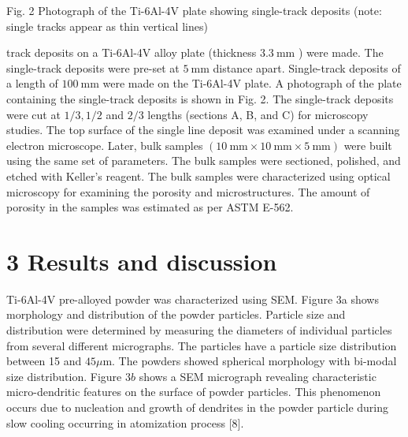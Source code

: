 \documentclass[10pt]{article}
\begin{document}
Fig. 2 Photograph of the Ti-6Al-4V plate showing single-track deposits (note: single tracks appear as thin vertical lines)

track deposits on a Ti-6Al-4V alloy plate (thickness $3.3 \mathrm{~mm}$ ) were made. The single-track deposits were pre-set at $5 \mathrm{~mm}$ distance apart. Single-track deposits of a length of $100 \mathrm{~mm}$ were made on the Ti-6Al-4V plate. A photograph of the plate containing the single-track deposits is shown in Fig. 2. The single-track deposits were cut at $1 / 3,1 / 2$ and $2 / 3$ lengths (sections A, B, and C) for microscopy studies. The top surface of the single line deposit was examined under a scanning electron microscope. Later, bulk samples $(10 \mathrm{~mm} \times 10 \mathrm{~mm} \times 5 \mathrm{~mm})$ were built using the same set of parameters. The bulk samples were sectioned, polished, and etched with Keller's reagent. The bulk samples were characterized using optical microscopy for examining the porosity and microstructures. The amount of porosity in the samples was estimated as per ASTM E-562.

\section*{3 Results and discussion}
Ti-6Al-4V pre-alloyed powder was characterized using SEM. Figure 3a shows morphology and distribution of the powder particles. Particle size and distribution were determined by measuring the diameters of individual particles from several different micrographs. The particles have a particle size distribution between 15 and $45 \mu \mathrm{m}$. The powders showed spherical morphology with bi-modal size distribution. Figure $3 b$ shows a SEM micrograph revealing characteristic micro-dendritic features on the surface of powder particles. This phenomenon occurs due to nucleation and growth of dendrites in the powder particle during slow cooling occurring in atomization process [8].
\end{document}
